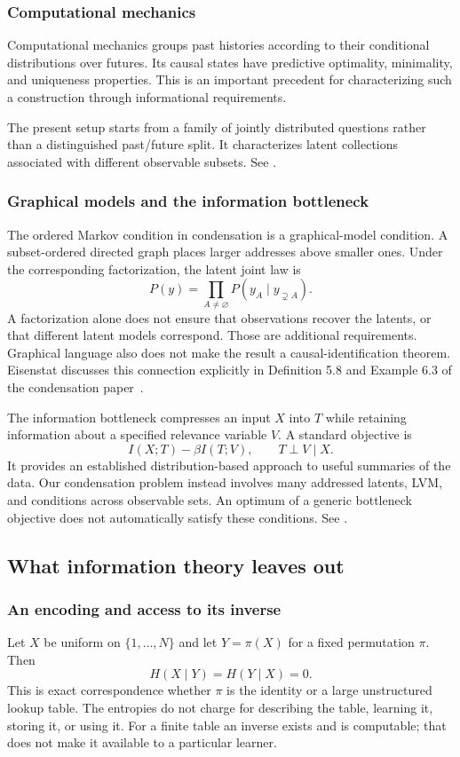 \documentclass[11pt]{article}
\begin{document}
\subsubsection{Computational mechanics}
Computational mechanics groups past histories according to their conditional
distributions over futures. Its causal states have predictive optimality,
minimality, and uniqueness properties. This is an important precedent for
characterizing such a construction through informational requirements.

The present setup starts from a family of jointly distributed questions rather
than a distinguished past/future split. It characterizes latent collections
associated with different observable subsets.
See \citet{shalizi2001computational}.

\subsubsection{Graphical models and the information bottleneck}
The ordered Markov condition in condensation is a graphical-model condition.
A subset-ordered directed graph places larger addresses above smaller ones.
Under the corresponding factorization, the latent joint law is
\[
 P(y)=\prod_{A\ne\varnothing}P(y_A\mid y_{\supsetneq A}).
\]
A factorization alone does not ensure that observations recover the latents,
or that different latent models correspond. Those are additional requirements.
Graphical language also does not make the result a causal-identification theorem.
Eisenstat discusses this connection explicitly in Definition 5.8 and Example 6.3
of the condensation paper~\citep{eisenstat2025condensation}.

The information bottleneck compresses an input $X$ into $T$ while retaining
information about a specified relevance variable $V$. A standard objective is
\[
 I(X;T)-\beta I(T;V), \qquad T\perp V\mid X.
\]
It provides an established distribution-based approach to useful summaries of
the data.
Our condensation problem instead involves many addressed latents, LVM, and
conditions across observable sets. An optimum of a generic
bottleneck objective does not automatically satisfy these conditions.
See \citet{tishby1999information}.

\subsection{What information theory leaves out}
\subsubsection{An encoding and access to its inverse}
Let $X$ be uniform on $\{1,\ldots,N\}$ and let $Y=\pi(X)$ for a fixed
permutation $\pi$. Then
\[
 H(X\mid Y)=H(Y\mid X)=0.
\]
This is exact correspondence whether $\pi$ is the identity or a large
unstructured lookup table. The entropies do not charge for describing the table,
learning it, storing it, or using it. For a finite table an inverse exists and is
computable; that does not make it available to a particular learner.
\end{document}
